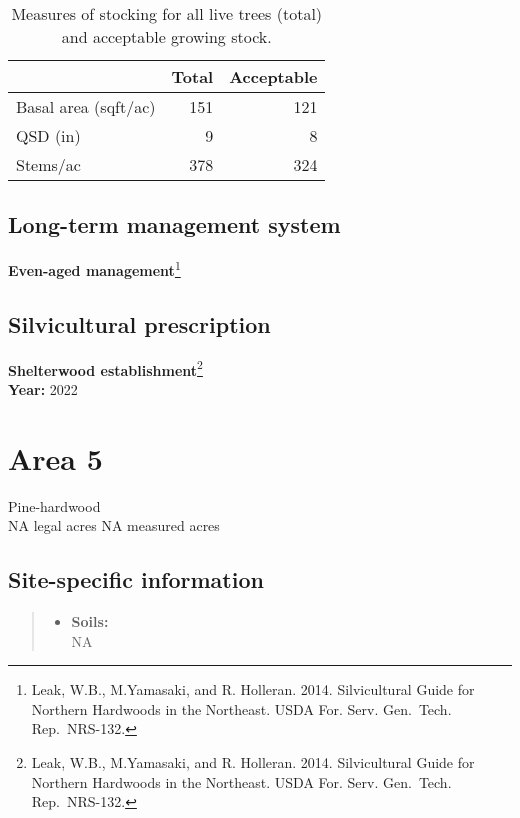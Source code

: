 \documentclass[]{tufte-handout}
\providecommand{\tightlist}{%
  \setlength{\itemsep}{0pt}\setlength{\parskip}{0pt}}
\begin{document}
\begin{table}

\caption{\label{tab:unnamed-chunk-17}Measures of stocking for all live trees (total) and acceptable growing stock.}
\centering
\begin{tabular}[t]{lrr}
\toprule
  & Total & Acceptable\\
\midrule
Basal area (sqft/ac) & 151 & 121\\
QSD (in) & 9 & 8\\
Stems/ac & 378 & 324\\
\bottomrule
\end{tabular}
\end{table}

\subsection{Long-term management
system}\label{long-term-management-system-3}

\textbf{Even-aged management}\footnote{Leak, W.B., M.Yamasaki, and R.
  Holleran. 2014. Silvicultural Guide for Northern Hardwoods in the
  Northeast. USDA For. Serv. Gen.~Tech. Rep.~NRS-132.}

\subsection{Silvicultural
prescription}\label{silvicultural-prescription-3}

\textbf{Shelterwood establishment}\footnote{Leak, W.B., M.Yamasaki, and
  R. Holleran. 2014. Silvicultural Guide for Northern Hardwoods in the
  Northeast. USDA For. Serv. Gen.~Tech. Rep.~NRS-132.}\\
\textbf{Year:} 2022

\newpage

\section{Area 5}\label{area-5}

Pine-hardwood\\
\noindent NA legal acres \textbar{} NA measured acres

\subsection{Site-specific
information}\label{site-specific-information-4}

\begin{quote}
\begin{itemize}
\tightlist
\item
  \textbf{Soils:}\\
  \indent\indent  NA
\end{itemize}
\end{quote}
\end{document}
